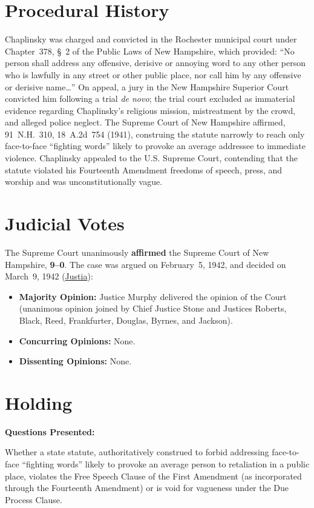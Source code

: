 \documentclass[12pt]{article}
\begin{document}
\section{Procedural History}
Chaplinsky was charged and convicted in the Rochester municipal court under Chapter~378, \S~2 of the Public Laws of New Hampshire, which provided: ``No person shall address any offensive, derisive or annoying word to any other person who is lawfully in any street or other public place, nor call him by any offensive or derisive name\ldots'' On appeal, a jury in the New Hampshire Superior Court convicted him following a trial \textit{de novo}; the trial court excluded as immaterial evidence regarding Chaplinsky's religious mission, mistreatment by the crowd, and alleged police neglect. The Supreme Court of New Hampshire affirmed, 91~N.H.~310, 18~A.2d~754 (1941), construing the statute narrowly to reach only face-to-face ``fighting words'' likely to provoke an average addressee to immediate violence. Chaplinsky appealed to the U.S. Supreme Court, contending that the statute violated his Fourteenth Amendment freedoms of speech, press, and worship and was unconstitutionally vague.

\section{Judicial Votes}
The Supreme Court unanimously \textbf{affirmed} the Supreme Court of New Hampshire, \textbf{9--0}. The case was argued on February~5, 1942, and decided on March~9, 1942 (\href{https://supreme.justia.com/cases/federal/us/315/568/}{Justia}):

\begin{itemize}

\item \textbf{Majority Opinion:} Justice Murphy delivered the opinion of the Court (unanimous opinion joined by Chief Justice Stone and Justices Roberts, Black, Reed, Frankfurter, Douglas, Byrnes, and Jackson).

\item \textbf{Concurring Opinions:} None.
    \item \textbf{Dissenting Opinions:} None.
\end{itemize}

\section{Holding}
\textbf{Questions Presented:}

Whether a state statute, authoritatively construed to forbid addressing face-to-face ``fighting words'' likely to provoke an average person to retaliation in a public place, violates the Free Speech Clause of the First Amendment (as incorporated through the Fourteenth Amendment) or is void for vagueness under the Due Process Clause.
\end{document}
